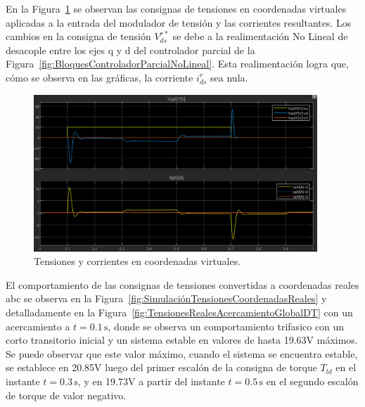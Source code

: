 \documentclass{article}
\begin{document}
En la Figura~\ref{fig:ComparacionTensionesCorrientesVirtuales} se observan las consignas de tensiones en coordenadas virtuales aplicadas a la entrada del modulador de tensión y las corrientes resultantes. Los cambios en la consigna de tensión \(V^{r*}_{ds}\) se debe a la realimentación No Lineal de desacople entre los ejes q y d del controlador parcial de la Figura~\ref{fig:BloquesControladorParcialNoLineal}. Esta realimentación logra que, cómo se observa en las gráficas, la corriente \(i^r_{ds}\) sea nula.
\begin{figure}[H]
    \centering
    \includegraphics[width=0.95\textwidth]{Imagenes/ComparacionTensionesCorrientesVirtuales.png}
    \caption{Tensiones y corrientes en coordenadas virtuales.}
    \label{fig:ComparacionTensionesCorrientesVirtuales}
\end{figure}

El comportamiento de las consignas de tensiones convertidas a coordenadas reales abc se observa en la Figura~\ref{fig:SimulaciónTensionesCoordenadasReales} y detalladamente en la Figura~\ref{fig:TensionesRealesAcercamientoGlobalDT} con un acercamiento a $t = 0{.}1\,\text{s}$, donde se observa un comportamiento trifasico con un corto transitorio inicial y un sistema estable en valores de hasta 19.63V máximos. Se puede observar que este valor máximo, cuando el sistema se encuentra estable, se establece en 20.85V luego del primer escalón de la consigna de torque \(T_{ld}\) en el instante $t = 0{.}3\, \text{s}$, y en 19.73V a partir del instante $t = 0{.}5\, \text{s}$ en el segundo escalón de torque de valor negativo. 
\end{document}
